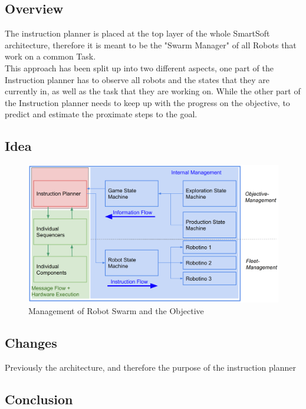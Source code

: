 

\subsection{Overview}
The instruction planner is placed at the top layer of the whole SmartSoft architecture,
therefore it is meant to be the "Swarm Manager" of all Robots that work on a common Task. \\
This approach has been split up into two different aspects, one part of the Instruction planner has to
observe all robots and the states that they are currently in, as well as the task that they are working on.
While the other part of the Instruction planner needs to keep up with the progress on the objective, to
predict and estimate the proximate steps to the goal.

\subsection{Idea}

\begin{figure}[h]
\centering
\includegraphics[scale=0.23]{pic/Instructionplanner2018.png}
\caption{Management of Robot Swarm and the Objective}
\label{fig:instr_overview}
\end{figure}

\subsection{Changes}
Previously the architecture, and therefore the purpose of the instruction planner

\subsection{Conclusion}

